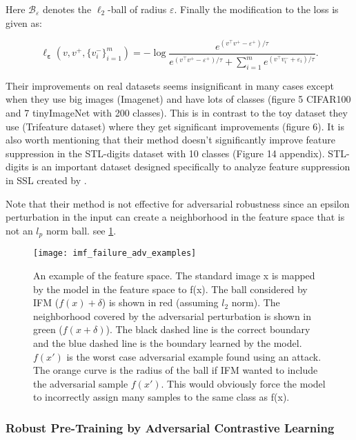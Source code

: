 \documentclass[../thesis.tex]{subfiles}
\begin{document}
	\vspace{1mm}
	
	Here $\mathcal B_\varepsilon$ denotes the $\ell_2$-ball of radius $\varepsilon$. Finally the modification to the loss is given as:
	
	\begin{equation}
	\ell_{\bm{\varepsilon}}(v,v^+, \{ v^-_i\}_{i=1}^m) = - \log \frac{e^{(v^\top v^+ - \varepsilon^+)/\tau}}{e^{(v^\top v^+ - \varepsilon^+)/\tau} + \sum_{i=1}^m e^{(v^\top v^-_i + \varepsilon_i)/\tau}}.
	\label{eqn: attack both loss}
	\end{equation} 
	
	Their improvements on real datasets seems insignificant in many cases except when they use big images (Imagenet) and have lots of classes (figure 5 CIFAR100 and 7 tinyImageNet with 200 classes). This is in contrast to the toy dataset they use (Trifeature dataset) where they get significant improvements (figure 6). It is also worth mentioning that their method doesn't significantly improve feature suppression in the STL-digits dataset with 10 classes (Figure 14 appendix). STL-digits is an important dataset designed specifically to analyze feature suppression in SSL created by \cite{shortcut_in_contrastive_losses}.
	
	Note that their method is not effective for adversarial robustness since an epsilon perturbation in the input can create a neighborhood in the feature space that is not an $l_p$ norm ball. see \ref{fig:advinput_vs_ifm}.
	
	\begin{figure}[h!]
		\centering
		\texttt{[image: imf\_failure\_adv\_examples]}
		\caption{An example of the feature space. The standard image x is mapped by the model in the feature space to f(x). The ball considered by IFM ($f(x) +\delta$) is shown in red (assuming $l_2$ norm). The neighborhood covered by the adversarial perturbation is shown in green ($f(x+\delta)$). The black dashed line is the correct boundary and the blue dashed line is the boundary learned by the model. $f(x')$ is the worst case adversarial example found using an attack. The orange curve is the radius of the ball if IFM wanted to include the adversarial sample $f(x')$. This would obviously force the model to incorrectly assign many samples to the same class as f(x).}
		\label{fig:advinput_vs_ifm}
	\end{figure}
	
	
	\subsubsection{Robust Pre-Training by Adversarial Contrastive Learning}
	
\end{document}
